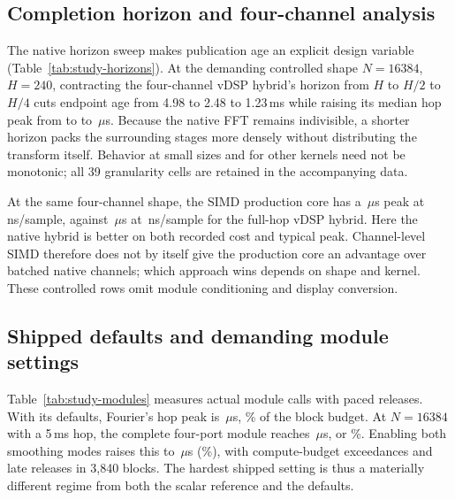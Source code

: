 \subsection{Completion horizon and four-channel analysis}
The native horizon sweep makes publication age an explicit design variable
(Table~\ref{tab:study-horizons}). At the demanding controlled shape
$N=16384$, $H=240$, contracting the four-channel vDSP hybrid's horizon from
$H$ to $H/2$ to $H/4$ cuts endpoint age from 4.98 to 2.48 to 1.23\,ms while
raising its median hop peak from \StudyHorizonFullPeak{} to
\StudyHorizonHalfPeak{} to \StudyHorizonQuarterPeak\,$\mu$s. Because the
native FFT remains indivisible, a shorter horizon packs the surrounding stages
more densely without distributing the transform itself. Behavior at small
sizes and for other kernels need not be monotonic; all 39 granularity cells
are retained in the accompanying data.



At the same four-channel shape, the SIMD production core has a
\StudySimdExtremePeak\,$\mu$s peak at \StudySimdExtremeCost\,ns/sample,
against \StudyHorizonFullPeak\,$\mu$s at \StudyHorizonFullCost\,ns/sample for
the full-hop vDSP hybrid. Here the native hybrid is better on both recorded
cost and typical peak. Channel-level SIMD therefore does not by itself give
the production core an advantage over batched native channels; which approach
wins depends on shape and kernel. These controlled rows omit module
conditioning and display conversion.

\subsection{Shipped defaults and demanding module settings}
Table~\ref{tab:study-modules} measures actual module calls with paced
releases. With its defaults, Fourier's hop peak is
\StudyModuleDefaultPeak\,$\mu$s, \StudyModuleDefaultBudgetPercent\% of the
block budget. At $N=16384$ with a 5\,ms hop, the complete four-port module
reaches \StudyModuleExtremePeak\,$\mu$s, or
\StudyModuleExtremeBudgetPercent\%. Enabling both smoothing modes raises this
to \StudyModuleBothPeak\,$\mu$s (\StudyModuleBothBudgetPercent\%), with
\StudyModuleBothComputeMisses{} compute-budget exceedances and
\StudyModuleBothMisses{} late releases in 3,840 blocks. The hardest shipped
setting is thus a materially different regime from both the scalar reference
and the defaults.




